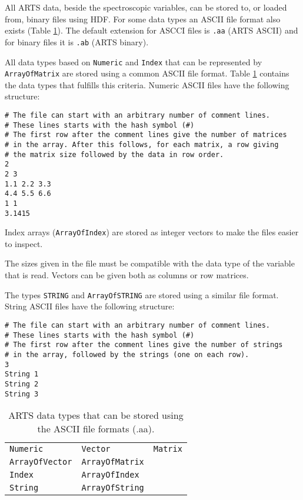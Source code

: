  \label{sec:formats:files}
 
 All ARTS data, beside the spectroscopic variables, can be stored to,
 or loaded from, binary files using HDF.  For some data types an ASCII
 file format also exists (Table \ref{table:format:aa}). The default
 extension for ASCCI files is \verb|.aa| (ARTS ASCII) and for binary
 files it is \verb|.ab| (ARTS binary).
 
  \label{sec:formats:file:ascii}
  
  All data types based on \verb|Numeric| and \verb|Index| that can be
  represented by \verb|ArrayOfMatrix| are stored using a common ASCII
  file format. Table \ref{table:format:aa} contains the data types that
  fulfills this criteria. Numeric ASCII files have the following 
  structure: \\
  {\footnotesize \begin{verbatim} 
# The file can start with an arbitrary number of comment lines.  
# These lines starts with the hash symbol (#) 
# The first row after the comment lines give the number of matrices 
# in the array. After this follows, for each matrix, a row giving 
# the matrix size followed by the data in row order.  
2 
2 3 
1.1 2.2 3.3 
4.4 5.5 6.6 
1 1 
3.1415
 \end{verbatim} 
}

 \noindent
 Index arrays (\verb|ArrayOfIndex|) are stored as integer vectors to
 make the files easier to inspect.
     
 The sizes given in the file must be compatible with the data type
 of the variable that is read. Vectors can be given both as
 columns or row matrices.
 
 The types \verb|STRING| and \verb|ArrayOfSTRING| are stored using a
 similar file format. String ASCII files have the following structure:
 {\footnotesize \begin{verbatim} 
# The file can start with an arbitrary number of comment lines.
# These lines starts with the hash symbol (#)
# The first row after the comment lines give the number of strings
# in the array, followed by the strings (one on each row).  
3
String 1
String 2
String 3
 \end{verbatim} 
}

 \begin{table}[t]
  \begin{tabular}{p{4cm} p{4cm} p{4cm}}
   \verb|Numeric|        & \verb|Vector|         & \verb|Matrix|          \\
   \verb|ArrayOfVector|  & \verb|ArrayOfMatrix|  &                        \\
   \verb|Index|          & \verb|ArrayOfIndex|  &                        \\
   \verb|String|          & \verb|ArrayOfString|  &                        \\
  \end{tabular}
  \caption{ARTS data types that can be stored using the ASCII
           file formats (.aa).}
  \label{table:format:aa}
 \end{table}
 

